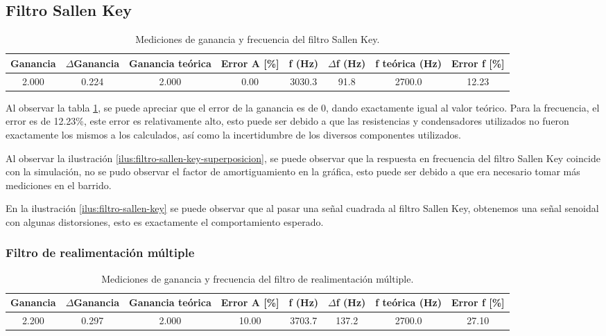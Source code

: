 
\subsection{Filtro Sallen Key}

\begin{table}[h!]
    \centering
    \begin{tabular}{|c|c|c|c|c|c|c|c|}
        \hline
        Ganancia & $\Delta$Ganancia & Ganancia teórica & Error A [\%] & f (Hz) & $\Delta$f (Hz) & f teórica (Hz) & Error f [\%] \\
        \hline
        2.000 & 0.224 & 2.000 & 0.00 & 3030.3 & 91.8 & 2700.0 & 12.23 \\
        \hline
    \end{tabular}
    \caption{Mediciones de ganancia y frecuencia del filtro Sallen Key.}
    \label{tab:error-filtro-sallen-key-ganancia-frecuencia}
\end{table}

Al observar la tabla \ref{tab:error-filtro-sallen-key-ganancia-frecuencia}, se puede apreciar que el error de la ganancia es de 0, dando exactamente igual al valor teórico. Para la frecuencia, el error es de 12.23\%, este error es relativamente alto, esto puede ser debido a que las resistencias y condensadores utilizados no fueron exactamente los mismos a los calculados, así como la incertidumbre de los diversos componentes utilizados.

Al observar la ilustración \ref{ilus:filtro-sallen-key-superposicion}, se puede observar que la respuesta en frecuencia del filtro Sallen Key coincide con la simulación, no se pudo observar el factor de amortiguamiento en la gráfica, esto puede ser debido a que era necesario tomar más mediciones en el barrido.

En la ilustración \ref{ilus:filtro-sallen-key} se puede observar que al pasar una señal cuadrada al filtro Sallen Key, obtenemos una señal senoidal con algunas distorsiones, esto es exactamente el comportamiento esperado.

\subsubsection{Filtro de realimentación múltiple}

\begin{table}[h!]
    \centering
    \begin{tabular}{|c|c|c|c|c|c|c|c|}
        \hline
        Ganancia & $\Delta$Ganancia & Ganancia teórica & Error A [\%] & f (Hz) & $\Delta$f (Hz) & f teórica (Hz) & Error f [\%] \\
        \hline
        2.200 & 0.297 & 2.000 & 10.00 & 3703.7 & 137.2 & 2700.0 & 27.10 \\
        \hline
    \end{tabular}
    \caption{Mediciones de ganancia y frecuencia del filtro de realimentación múltiple.}
    \label{tab:error-filtro-realimentacion-multiple-ganancia-frecuencia}
\end{table}

